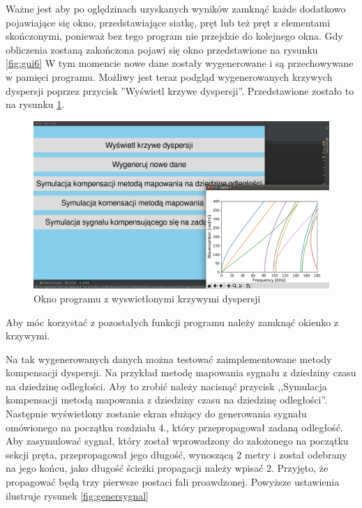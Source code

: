 Ważne jest aby po oględzinach uzyskanych wyników zamknąć każde dodatkowo pojawiające się okno, przedstawiające siatkę, pręt lub też pręt z elementami skończonymi, ponieważ bez tego program nie przejdzie do kolejnego okna. Gdy obliczenia zostaną zakończona pojawi się okno przedstawione na rysunku \ref{fig:gui6} W tym momencie nowe dane zostały wygenerowane i są przechowywane w pamięci programu. Możliwy jest teraz podgląd wygenerowanych krzywych dyspersji poprzez przycisk ''Wyświetl krzywe dyspersji''. Przedstawione zostało to na rysunku \ref{fig:krzywesa}.

\begin{figure}[h]
\centering
\includegraphics[width=13cm]{Zdjecia/5/kasia/krzywesa}
\caption{Okno programu z wyswietlonymi krzywymi dyspersji}
\label{fig:krzywesa}
\end{figure}

Aby móc korzystać z pozostałych funkcji programu należy zamknąć okienko z krzywymi.

Na tak wygenerowanych danych można testować zaimplementowane metody kompensacji dyspersji. Na przykład metodę mapowania sygnału z dziedziny czasu na dziedzinę odległości. Aby to zrobić należy nacisnąć przycisk ,,Symulacja kompensacji metodą mapowania z dziedziny czasu na dziedzinę odległości''. Następnie wyświetlony zostanie ekran służący do generowania sygnału omówionego na początku rozdziału 4., który przepropagował zadaną odległość. Aby zasymulować sygnał, który został wprowadzony do założonego na początku sekcji pręta, przepropagował jego długość, wynoszącą 2 metry i został odebrany na jego końcu, jako długość ścieżki propagacji należy wpisać 2. Przyjęto, że propagować będą trzy pierwsze postaci fali proawdzonej. Powyższe ustawienia ilustruje rysunek \ref{fig:genersygnal}

